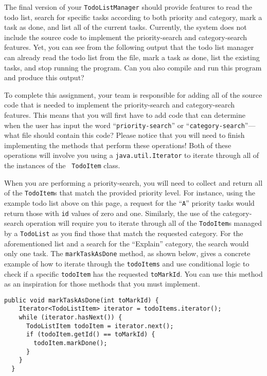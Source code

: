 \documentclass[11pt]{article}
\newcommand{\readme}{\lstinline{README.md}}
\begin{document}

The final version of your {\tt TodoListManager} should provide features to read the todo list, search for specific tasks
according to both priority and category, mark a task as done, and list all of the current tasks. Currently, the system
does not include the source code to implement the priority-search and category-search features. Yet, you can see from
the following output that the todo list manager can already read the todo list from the file, mark a task as done, list
the existing tasks, and stop running the program. Can you also compile and run this program and produce this output?

To complete this assignment, your team is responsible for adding all of the source code that is needed to implement the
priority-search and category-search features. This means that you will first have to add code that can determine when
the user has input the word ``{\tt priority-search}'' or ``{\tt category-search}''---what file should contain this code?
Please notice that you will need to finish implementing the methods that perform these operations! Both of these
operations will involve you using a {\tt java.util.Iterator} to iterate through all of the instances of the {\tt
TodoItem} class.

When you are performing a priority-search, you will need to collect and return all of the {\tt TodoItem}s that match the
provided priority level. For instance, using the example todo list above on this page, a request for the ``{\tt A}''
priority tasks would return those with {\tt id} values of zero and one. Similarly, the use of the category-search
operation will require you to iterate through all of the {\tt TodoItem}s managed by a {\tt TodoList} as you find those
that match the requested category. For the aforementioned list and a search for the ``Explain'' category, the search
would only one task. The {\tt markTaskAsDone} method, as shown below, gives a concrete example of how to iterate through
the {\tt todoItems} and use conditional logic to check if a specific {\tt todoItem} has the requested {\tt toMarkId}.
You can use this method as an inspiration for those methods that you must implement.

\vspace{-0.1in}
\begin{verbatim}
public void markTaskAsDone(int toMarkId) {
    Iterator<TodoListItem> iterator = todoItems.iterator();
    while (iterator.hasNext()) {
      TodoListItem todoItem = iterator.next();
      if (todoItem.getId() == toMarkId) {
        todoItem.markDone();
      }
    }
  }
\end{verbatim}
\end{document}
